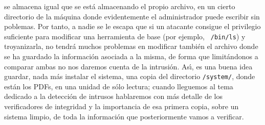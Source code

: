 se almacena igual que se est\'a almacenando el propio archivo, en un cierto 
directorio de la m\'aquina donde evidentemente el administrador puede escribir 
sin poblemas. Por tanto, a nadie se le escapa que si un atacante consigue el 
privilegio suficiente para modificar una herramienta de base (por ejemplo, {\tt 
/bin/ls}) y troyanizarla, no tendr\'a muchos problemas en modificar tambi\'en
el archivo donde se ha guardado la informaci\'on asociada a la misma, de forma 
que limit\'andonos a comparar ambas no nos daremos cuenta de la 
intrusi\'on. As\'{\i}, es una buena idea guardar, nada m\'as instalar el 
sistema, una copia del directorio {\tt /system/}, donde est\'an los PDFs, en una
unidad de s\'olo lectura; cuando lleguemos al tema dedicado a la detecci\'on de
intrusos hablaremos con m\'as detalle de los verificadores de integridad y la
importancia de esa primera copia, sobre un sistema limpio, de toda la 
informaci\'on que posteriormente vamos a verificar.
